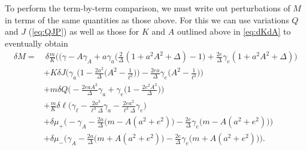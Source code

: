 \documentclass[
twoside,
openright,
frontopenright,
]{dmathesis}
\newcommand{\nn}{\nonumber}
\begin{document}
To perform the term-by-term comparison, we must write out perturbations of $M$
in terms of the same quantities as those above. For this we can use variations
$Q$ and $J$ (\cref{eq:QJP}) as well as those for $K$ and $A$ outlined above in
\cref{eq:dKdA} to eventually obtain 
\begin{align}
\delta M = &~\delta\frac{m}{K}\bigg((\gamma-A\gamma_{A}+a\gamma_{a}\Big(\frac{2}{\Delta}(1+a^2A^2+\Delta)-1\Big)+\frac{2e}{\Delta}\gamma_{e}(1+a^2A^2+\Delta)\bigg) \nn\\
&+K\delta J\bigg(\gamma_{a}\Big(1-\frac{2a^2}{\Delta}\Big(A^2-\frac{1}{\ell^2}\Big)\Big)-\frac{2ea}{\Delta}\gamma_{e}\Big(A^2-\frac{1}{\ell^2}\Big)\bigg) \nn\\
&+m\delta Q\bigg(-\frac{2eaA^2}{\Delta}\gamma_{a}+\gamma_{e}\Big(1-\frac{2e^2A^2}{\Delta}\Big)\bigg) \nn\\
&+\frac{m}{K}\delta\ell\Big(\gamma_{\ell}-\frac{2a^3}{\ell^3\Delta}\gamma_{a}-\frac{2ea^2}{\ell^3\Delta}\gamma_{e}\Big) \nn\\
&+\delta \mu_+\Big( -\gamma_{A}-\frac{2a}{\Delta}\big(m-A(a^2+e^2)\big)-\frac{2e}{\Delta}\gamma_{e}\big(m-A(a^2+e^2)\big)\Big) \nn\\
&+\delta \mu_-\Big( \gamma_{A}-\frac{2a}{\Delta}\big(m+A(a^2+e^2)\big)-\frac{2e}{\Delta}\gamma_{e}\big(m+A(a^2+e^2)\big)\Big).
\label{eq:dM2}
\end{align}
\end{document}

